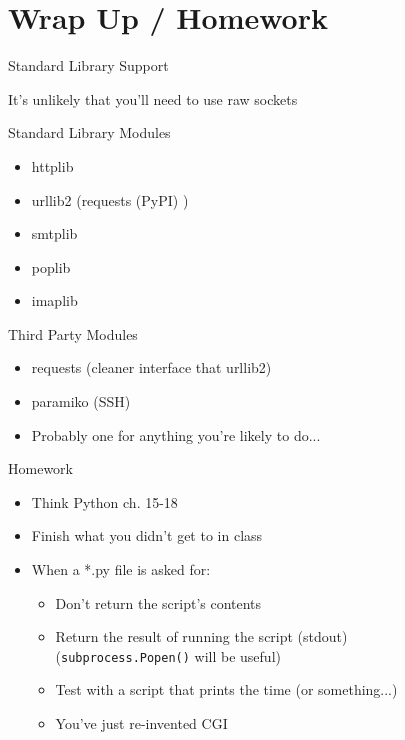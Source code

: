 \documentclass{beamer}
\begin{document}
\section{Wrap Up / Homework}

\begin{frame}[fragile]{Standard Library Support}

{\Large It's unlikely that you'll need to use raw sockets}

\vfill
{\Large Standard Library Modules}
\begin{itemize}
  \item httplib
  \item urllib2 (requests (PyPI) )
  \item smtplib
  \item poplib
  \item imaplib
\end{itemize}

{\Large Third Party Modules}
\begin{itemize}
  \item requests (cleaner interface that urllib2)
  \item paramiko (SSH)
  \item Probably one for anything you're likely to do...
\end{itemize}
  
\end{frame}

\begin{frame}[fragile]{Homework}

\begin{itemize}
  \item Think Python ch. 15-18
  \item Finish what you didn't get to in class
  \item When a *.py file is asked for: 
    \begin{itemize}
      \item Don't return the script's contents
      \item Return the result of running the script (stdout)\\
            (\verb|subprocess.Popen()| will be useful)
      \item Test with a script that prints the time (or something...)
      \item You've just re-invented CGI
    \end{itemize}
\end{itemize}
\end{frame}
\end{document}
